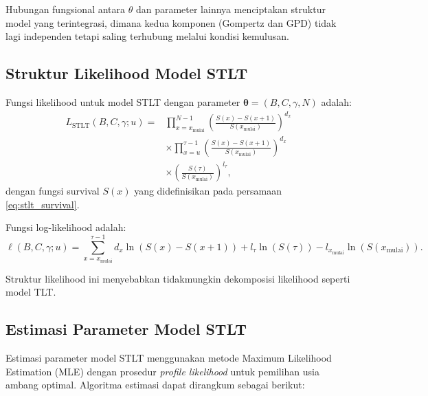 Hubungan fungsional antara $\theta$ dan parameter lainnya menciptakan struktur model yang terintegrasi, dimana kedua komponen (Gompertz dan GPD) tidak lagi independen tetapi saling terhubung melalui kondisi kemulusan.

\subsection{Struktur Likelihood Model STLT}

Fungsi likelihood untuk model STLT dengan parameter $\boldsymbol{\theta} = (B, C, \gamma, N)$ adalah:
\begin{equation}
\begin{split}
L_{\text{STLT}}(B, C, \gamma; u) = &\prod_{x=x_{\text{mulai}}}^{N-1} \left(\frac{S(x) - S(x+1)}{S(x_{\text{mulai}})}\right)^{d_x} \\
&\times \prod_{x=u}^{\tau-1} \left(\frac{S(x) - S(x+1)}{S(x_{\text{mulai}})}\right)^{d_x} \\
&\times \left(\frac{S(\tau)}{S(x_{\text{mulai}})}\right)^{l_\tau},
\end{split}
\label{eq:stlt_likelihood}
\end{equation}
dengan fungsi survival $S(x)$ yang didefinisikan pada persamaan \eqref{eq:stlt_survival}.

Fungsi log-likelihood adalah:
\begin{equation}
\ell(B, C, \gamma; u) = \sum_{x=x_{\text{mulai}}}^{\tau-1} d_x \ln(S(x) - S(x+1)) + l_\tau \ln(S(\tau)) - l_{x_{\text{mulai}}} \ln(S(x_{\text{mulai}})).
\label{eq:stlt_loglikelihood}
\end{equation}

Struktur likelihood ini menyebabkan tidakmungkin dekomposisi likelihood seperti model TLT.

\subsection{Estimasi Parameter Model STLT}

Estimasi parameter model STLT menggunakan metode Maximum Likelihood Estimation (MLE) dengan prosedur \textit{profile likelihood} untuk pemilihan usia ambang optimal. Algoritma estimasi dapat dirangkum sebagai berikut:

